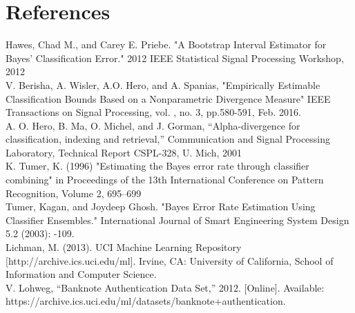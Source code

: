 \documentclass{article}
\begin{document}
	


\newpage
	\section*{References}
	\noindent [1] Hawes, Chad M., and Carey E. Priebe. "A Bootstrap Interval Estimator for Bayes' Classification 
	\indent Error." 2012 IEEE Statistical Signal Processing Workshop, 2012
	\\ [0.5ex]
	
	\noindent[2] V. Berisha, A. Wisler, A.O. Hero, and A. Spanias, "Empirically Estimable Classification Bounds 
	\indent Based on a Nonparametric Divergence Measure" IEEE Transactions on Signal Processing, vol. 
	, no. 3, pp.580-591, Feb. 2016.
	\\ [0.5ex]
	
	\noindent[3] A. O. Hero, B. Ma, O. Michel, and J. Gorman, “Alpha-divergence for classification, indexing 
	\indent and retrieval,” Communication and Signal Processing Laboratory, Technical Report CSPL-328, 
	\indent U. Mich, 2001
	\\ [0.5ex]
	
	\noindent [4] K. Tumer, K. (1996) "Estimating the Bayes error rate through classifier combining" in Proceedings 
	\indent of the 13th International Conference on Pattern Recognition, Volume 2, 695–699
	\\ [0.5ex]
	
	\noindent[5] Tumer, Kagan, and Joydeep Ghosh. "Bayes Error Rate Estimation Using Classifier Ensembles." 
	\indent International Journal of Smart Engineering System Design 5.2 (2003): -109.
	\\ [0.5ex]
	
	\noindent[6] Lichman, M. (2013). UCI Machine Learning Repository [http://archive.ics.uci.edu/ml]. Irvine, 
	\indent CA: University of California, School of Information and Computer Science.
	\\ [0.5ex]
	
	\noindent [7] V. Lohweg, “Banknote Authentication Data Set,” 2012. [Online]. Available: https://archive.ics.uci.edu/ml/datasets/banknote+authentication.
	\\ [0.5ex]
	
\end{document}

